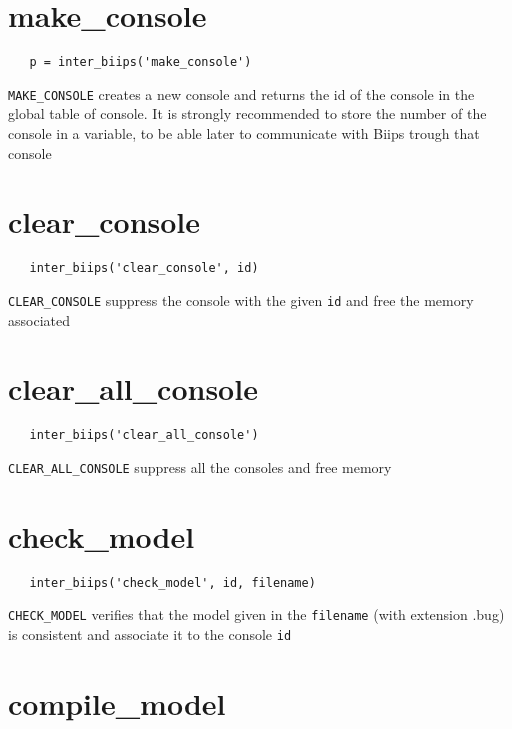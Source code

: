 \documentclass[11pt]{article}
\begin{document}
\section{make\_console}
 \begin{lstlisting}
   p = inter_biips('make_console')
 \end{lstlisting}
   
   \texttt{MAKE\_CONSOLE}  creates a new console and returns the id of the console in the global table of console. It
   is strongly recommended to store the number of the console in a variable, to be able later to communicate with Biips trough that
   console

\section{clear\_console}

 \begin{lstlisting}
   inter_biips('clear_console', id)
 \end{lstlisting}

  \texttt{CLEAR\_CONSOLE} suppress the console with the given \texttt{id} and free the memory associated

\section{clear\_all\_console}
 
 \begin{lstlisting}
   inter_biips('clear_all_console')
 \end{lstlisting}

  \texttt{CLEAR\_ALL\_CONSOLE} suppress all the consoles and free memory

\section{check\_model}

 \begin{lstlisting}
   inter_biips('check_model', id, filename)
 \end{lstlisting}
  
 \texttt{CHECK\_MODEL} verifies that the model given in the \texttt{filename} (with extension .bug) is consistent and associate it to the console \texttt{id}

\section{compile\_model}
\end{document}
